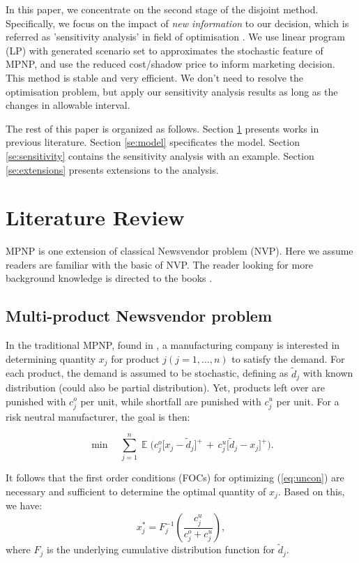 \documentclass[a4paper,11pt]{article}
\begin{document}
In this paper, we concentrate on the second stage of the disjoint method. Specifically, we focus on the impact of \emph{new information} to our decision, which is referred as 'sensitivity analysis' in field of optimisation \cite{D98,Ga03,Va20}. We use linear program (LP) with generated scenario set to approximates the stochastic feature of MPNP, and use the reduced cost/shadow price to inform marketing decision. This method is stable and very efficient. We don't need to resolve the optimisation problem, but apply our sensitivity analysis results as long as the changes in allowable interval.

The rest of this paper is organized as follows. Section \ref{se:lit} presents works in previous literature. Section \ref{se:model} specificates the model. Section \ref{se:sensitivity} contains the sensitivity analysis with an example. Section \ref{se:extensions} presents extensions to the analysis.
\section{Literature Review}
\label{se:lit}
MPNP is one extension of classical Newsvendor problem (NVP). Here we assume readers are familiar with the basic of NVP. The reader looking for more background knowledge is directed to the books \cite{Ch12,Po02,SPP98}.

\subsection{Multi-product Newsvendor problem}
In the traditional MPNP, found in \cite{HW63,NS84}, a manufacturing company is interested in determining quantity $x_j$ for product $j (j=1,\dots,n)$ to satisfy the demand. For each product, the demand is assumed to be stochastic, defining as ${\tilde d}_j$ with known distribution (could also be partial distribution). Yet, products left over are punished with $c_j^o$ per unit, while shortfall are punished with $c_j^u$ per unit. For a risk neutral manufacturer, the goal is then:

\begin{equation}
    \min \quad \sum_{j=1}^n \mathop{\mathbb{E}} \big( c^o_j \big[  x_j - {\tilde d}_j \big]^+ \, + \, c^u_j \big[ {\tilde d}_j - x_j \big]^+ \big).
\label{eq:uncon}
\end{equation}

It follows that the first order conditions (FOCs) for optimizing (\ref{eq:uncon}) are
necessary and sufficient to determine the optimal quantity of $x_j$. Based on this, we have:
\[
    x_j^* = F_j^{-1}\left( \frac{c_j^u}{c_j^o+c_j^u} \right),
\]
where $F_j$ is the underlying cumulative distribution function for ${\tilde d}_j$.
\end{document}
